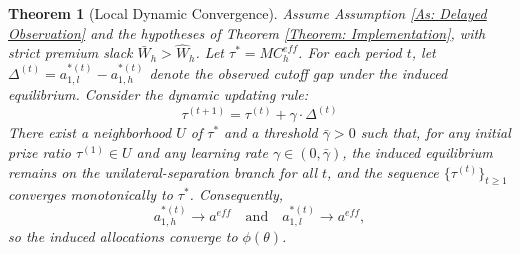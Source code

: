 \documentclass[12pt, a4paper]{article}
\newtheorem{theorem}{Theorem}
\begin{document}
\begin{theorem}[Local Dynamic Convergence]
\label{Theorem: Dynamic Convergence}
    Assume Assumption \ref{As: Delayed Observation} and the hypotheses of Theorem \ref{Theorem: Implementation}, with strict premium slack $\bar{W}_h > \hat{W}_h$. Let $\tau^* = MC_h^{eff}$. For each period $t$, let $\Delta^{(t)} = a_{1,l}^{*(t)} - a_{1,h}^{*(t)}$ denote the observed cutoff gap under the induced equilibrium. Consider the dynamic updating rule:
    \[
        \tau^{(t+1)} = \tau^{(t)} + \gamma \cdot \Delta^{(t)}
    \]
    There exist a neighborhood $U$ of $\tau^*$ and a threshold $\bar{\gamma} > 0$ such that, for any initial prize ratio $\tau^{(1)} \in U$ and any learning rate $\gamma \in (0, \bar{\gamma})$, the induced equilibrium remains on the unilateral-separation branch for all $t$, and the sequence $\{\tau^{(t)}\}_{t \ge 1}$ converges monotonically to $\tau^*$. Consequently,
    \[
        a_{1,h}^{*(t)} \to a^{eff}
        \quad \text{and} \quad
        a_{1,l}^{*(t)} \to a^{eff},
    \]
    so the induced allocations converge to $\phi (\theta)$.
\end{theorem}
\end{document}
